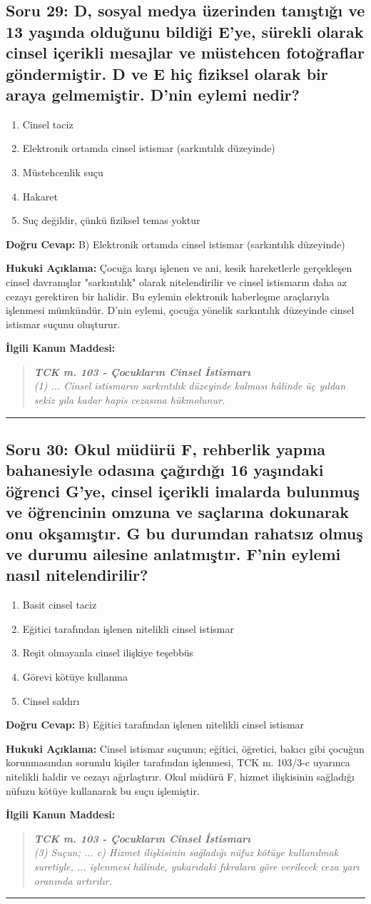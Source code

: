 \documentclass[12pt, a4paper]{article}
\newcommand{\question}[1]{\subsection*{#1}}
\newcommand{\options}[5]{
    \begin{enumerate}[label=\Alph*)]
        \item #1
        \item #2
        \item #3
        \item #4
        \item #5
    \end{enumerate}
}
\newcommand{\answer}[3]{
    \vspace{5mm}
    \noindent\textbf{Doğru Cevap:} #1
    \vspace{3mm}
    
    \noindent\textbf{Hukuki Açıklama:} #2
    \vspace{3mm}
    
    \noindent\textbf{İlgili Kanun Maddesi:}
    \begin{quotation}
        \small
        \textit{#3}
    \end{quotation}
    \vspace{5mm}
    \hrule
}
\begin{document}
\question{Soru 29: D, sosyal medya üzerinden tanıştığı ve 13 yaşında olduğunu bildiği E'ye, sürekli olarak cinsel içerikli mesajlar ve müstehcen fotoğraflar göndermiştir. D ve E hiç fiziksel olarak bir araya gelmemiştir. D'nin eylemi nedir?}
\options
{Cinsel taciz}
{Elektronik ortamda cinsel istismar (sarkıntılık düzeyinde)}
{Müstehcenlik suçu}
{Hakaret}
{Suç değildir, çünkü fiziksel temas yoktur}
\answer{B) Elektronik ortamda cinsel istismar (sarkıntılık düzeyinde)}
{Çocuğa karşı işlenen ve ani, kesik hareketlerle gerçekleşen cinsel davranışlar "sarkıntılık" olarak nitelendirilir ve cinsel istismarın daha az cezayı gerektiren bir halidir. Bu eylemin elektronik haberleşme araçlarıyla işlenmesi mümkündür. D'nin eylemi, çocuğa yönelik sarkıntılık düzeyinde cinsel istismar suçunu oluşturur.}
{\textbf{TCK m. 103 - Çocukların Cinsel İstismarı} \\ (1) ... Cinsel istismarın sarkıntılık düzeyinde kalması hâlinde üç yıldan sekiz yıla kadar hapis cezasına hükmolunur.}

\question{Soru 30: Okul müdürü F, rehberlik yapma bahanesiyle odasına çağırdığı 16 yaşındaki öğrenci G'ye, cinsel içerikli imalarda bulunmuş ve öğrencinin omzuna ve saçlarına dokunarak onu okşamıştır. G bu durumdan rahatsız olmuş ve durumu ailesine anlatmıştır. F'nin eylemi nasıl nitelendirilir?}
\options
{Basit cinsel taciz}
{Eğitici tarafından işlenen nitelikli cinsel istismar}
{Reşit olmayanla cinsel ilişkiye teşebbüs}
{Görevi kötüye kullanma}
{Cinsel saldırı}
\answer{B) Eğitici tarafından işlenen nitelikli cinsel istismar}
{Cinsel istismar suçunun; eğitici, öğretici, bakıcı gibi çocuğun korunmasından sorumlu kişiler tarafından işlenmesi, TCK m. 103/3-c uyarınca nitelikli haldir ve cezayı ağırlaştırır. Okul müdürü F, hizmet ilişkisinin sağladığı nüfuzu kötüye kullanarak bu suçu işlemiştir.}
{\textbf{TCK m. 103 - Çocukların Cinsel İstismarı} \\ (3) Suçun; ... c) Hizmet ilişkisinin sağladığı nüfuz kötüye kullanılmak suretiyle, ... işlenmesi hâlinde, yukarıdaki fıkralara göre verilecek ceza yarı oranında artırılır.}
\end{document}
